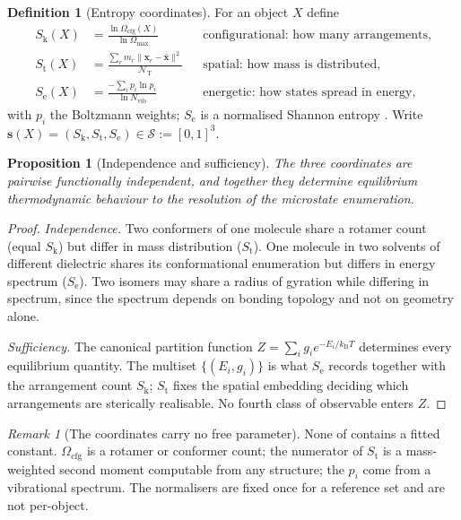\documentclass[11pt,twocolumn,a4paper]{article}
\theoremstyle{thmstyle}
\newtheorem{proposition}[theorem]{Proposition}
\theoremstyle{definition}
\newtheorem{definition}[theorem]{Definition}
\theoremstyle{remark}
\newtheorem{remark}[theorem]{Remark}
\newcommand{\Sspace}{\mathcal{S}}
\newcommand{\Sk}{S_{\mathrm{k}}}
\newcommand{\St}{S_{\mathrm{t}}}
\newcommand{\Se}{S_{\mathrm{e}}}
\newcommand{\kB}{k_{\mathrm{B}}}
\newcommand{\norm}[1]{\lVert#1\rVert}
\begin{document}
\begin{definition}[Entropy coordinates]
\label{def:scoords}
For an object $X$ define
\begin{align}
\Sk(X) &= \frac{\ln \Omega_{\mathrm{cfg}}(X)}{\ln \Omega_{\max}}
  &&\text{configurational: how many arrangements,}\\
\St(X) &= \frac{\sum_r m_r \norm{\mathbf{x}_r-\bar{\mathbf{x}}}^2}
               {\mathcal{N}_{\mathrm{T}}}
  &&\text{spatial: how mass is distributed,}\\
\Se(X) &= \frac{-\sum_i p_i \ln p_i}{\ln N_{\mathrm{vib}}}
  &&\text{energetic: how states spread in energy,}
\end{align}
with $p_i$ the Boltzmann weights; $\Se$ is a normalised Shannon entropy
\citep{shannon1948,cover2006}. Write
$\mathbf{s}(X)=(\Sk,\St,\Se) \in \Sspace := [0,1]^3$.
\end{definition}

\begin{proposition}[Independence and sufficiency]
\label{prop:triple}
The three coordinates are pairwise functionally independent, and together they
determine equilibrium thermodynamic behaviour to the resolution of the
microstate enumeration.
\end{proposition}

\begin{proof}
\emph{Independence.} Two conformers of one molecule share a rotamer count
(equal $\Sk$) but differ in mass distribution ($\St$). One molecule in two
solvents of different dielectric shares its conformational enumeration but
differs in energy spectrum ($\Se$). Two isomers may share a radius of gyration
while differing in spectrum, since the spectrum depends on bonding topology
and not on geometry alone.

\emph{Sufficiency.} The canonical partition function
$Z=\sum_i g_i e^{-E_i/\kB T}$ determines every equilibrium quantity. The
multiset $\{(E_i,g_i)\}$ is what $\Se$ records together with the arrangement
count $\Sk$; $\St$ fixes the spatial embedding deciding which arrangements are
sterically realisable. No fourth class of observable enters $Z$.
\end{proof}

\begin{remark}[The coordinates carry no free parameter]
\label{rem:nofit}
None of  contains a fitted constant. $\Omega_{\mathrm{cfg}}$
is a rotamer or conformer count; the numerator of $\St$ is a mass-weighted
second moment computable from any structure; the $p_i$ come from a vibrational
spectrum. The normalisers are fixed once for a reference set and are not
per-object.
\end{remark}
\end{document}
